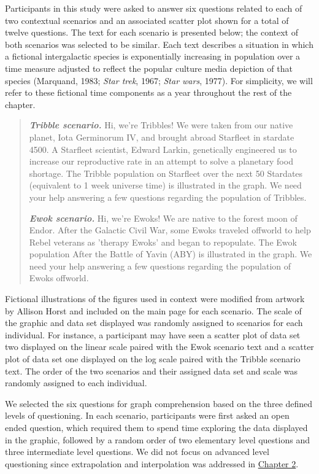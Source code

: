 \documentclass[print]{nuthesis}
\begin{document}
Participants in this study were asked to answer six questions related to each of two contextual scenarios and an associated scatter plot shown for a total of twelve questions.
The text for each scenario is presented below; the context of both scenarios was selected to be similar.
Each text describes a situation in which a fictional intergalactic species is exponentially increasing in population over a time measure adjusted to reflect the popular culture media depiction of that species (Marquand, 1983; \emph{Star trek}, 1967; \emph{Star wars}, 1977).
For simplicity, we will refer to these fictional time components as a year throughout the rest of the chapter.

\begin{quote}
\textbf{\textit{Tribble scenario.}} Hi, we're Tribbles! We were taken from our native planet, Iota Germinorum IV, and brought abroad Starfleet in stardate 4500. A Starfleet scientist, Edward Larkin, genetically engineered us to increase our reproductive rate in an attempt to solve a planetary food shortage. The Tribble population on Starfleet over the next 50 Stardates (equivalent to 1 week universe time) is illustrated in the graph. We need your help answering a few questions regarding the population of Tribbles.

\textbf{\textit{Ewok scenario.}} Hi, we're Ewoks! We are native to the forest moon of Endor. After the Galactic Civil War, some Ewoks traveled offworld to help Rebel veterans as 'therapy Ewoks' and began to repopulate. The Ewok population After the Battle of Yavin (ABY) is illustrated in the graph. We need your help answering a few questions regarding the population of Ewoks offworld.
\end{quote}

Fictional illustrations of the figures used in context were modified from artwork by Allison Horst and included on the main page for each scenario.
The scale of the graphic and data set displayed was randomly assigned to scenarios for each individual.
For instance, a participant may have seen a scatter plot of data set two displayed on the linear scale paired with the Ewok scenario text and a scatter plot of data set one displayed on the log scale paired with the Tribble scenario text.
The order of the two scenarios and their assigned data set and scale was randomly assigned to each individual.

We selected the six questions  for graph comprehension based on the three defined levels of questioning.
In each scenario, participants were first asked an open ended question, which required them to spend time exploring the data displayed in the graphic, followed by a random order of two elementary level questions and three intermediate level questions.
We did not focus on advanced level questioning since extrapolation and interpolation was addressed in \protect\hyperlink{youdrawit}{Chapter 2}.
\end{document}
